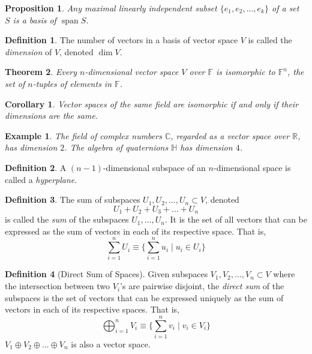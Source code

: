 \documentclass{article}
\DeclareMathOperator{\Span}{span}
\newtheorem{theorem}{Theorem}[section]
\newtheorem{proposition}[theorem]{Proposition}
\newtheorem{example}{Example}[section]
\newtheorem{corollary}{Corollary}[theorem]
\theoremstyle{remark}
\theoremstyle{definition}
\newtheorem{definition}{Definition}[section]
\begin{document}
    \begin{proposition}
    Any maximal linearly independent subset $\{ e_1, e_2, ..., e_k\}$ of a set $S$ is a basis of $\Span S$. 
    \end{proposition}

    \begin{definition}
    The number of vectors in a basis of vector space $V$ is called the \textit{dimension} of $V$, denoted $\dim{V}$. 
    \end{definition}

    \begin{theorem}
    Every $n$-dimensional vector space $V$ over $\mathbb{F}$ is isomorphic to $\mathbb{F}^n$, the set of $n$-tuples of elements in $\mathbb{F}$. 
    \end{theorem}

    \begin{corollary}
    Vector spaces of the same field are isomorphic if and only if their dimensions are the same. 
    \end{corollary}

    \begin{example}
    The field of complex numbers $\mathbb{C}$, regarded as a vector space over $\mathbb{R}$, has dimension $2$. The algebra of quaternions $\mathbb{H}$ has dimension $4$. 
    \end{example}

    \begin{definition}
    A $(n - 1)$-dimensional subspace of an $n$-dimensional space is called a \textit{hyperplane}. 
    \end{definition}

    \begin{definition}
    The sum of subspaces $U_1, U_2, ..., U_n \subset V$, denoted
    \[U_1 + U_2 + U_3 + ... + U_n\]
    is called the \textit{sum} of the subspaces $U_1, ..., U_n$. It is the set of all vectors that can be expressed as the sum of vectors in each of its respective space. That is, 
    \[ \sum_{i=1}^n U_i \equiv \Big\{ \sum_{i = 1}^n u_i \;|\; u_i \in U_i\Big\}\]

    \end{definition}

    \begin{definition}[Direct Sum of Spaces]
    Given subspaces $V_1, V_2, ..., V_n \subset V$ where the intersection between two $V_i$'s are pairwise disjoint, the \textit{direct sum} of the subspaces is the set of vectors that can be expressed uniquely as the sum of vectors in each of its respective spaces. That is, 
    \[\bigoplus_{i=1}^n V_i \equiv \Big\{ \sum_{i=1}^n v_i \; | \; v_i \in V_i\Big\}\]
    $V_1 \oplus V_2 \oplus ... \oplus V_n$ is also a vector space. 
    \end{definition}
\end{document}
